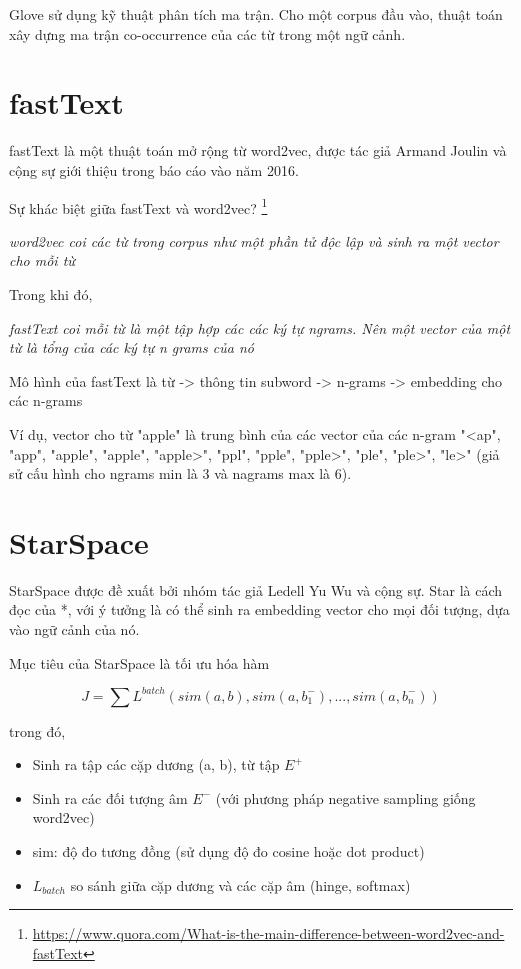 Glove \cite{DBLP:conf/emnlp/PenningtonSM14} sử dụng kỹ thuật phân tích ma trận. Cho một corpus đầu vào, thuật toán xây dựng ma trận co-occurrence của các từ trong một ngữ cảnh.

\section{fastText}

fastText \cite{DBLP:conf/eacl/GraveMJB17} là một thuật toán mở rộng từ word2vec, được tác giả Armand Joulin  và cộng sự giới thiệu trong báo cáo vào năm 2016.

\noindent Sự khác biệt giữa fastText và word2vec? \footnote{\href{https://www.quora.com/What-is-the-main-difference-between-word2vec-and-fastText}{https://www.quora.com/What-is-the-main-difference-between-word2vec-and-fastText}}

\textit{word2vec coi các từ trong corpus như một phần tử độc lập và sinh ra một vector cho mỗi từ}

\noindent Trong khi đó,

\textit{fastText coi mỗi từ là một tập hợp các các ký tự ngrams. Nên một vector của một từ là tổng của các ký tự n grams của nó}

Mô hình của fastText là từ -> thông tin subword -> n-grams -> embedding cho các n-grams

Ví dụ, vector cho từ "apple" là trung bình của các vector của các n-gram "<ap", "app", "apple", "apple", "apple>", "ppl", "pple", "pple>", "ple", "ple>", "le>" (giả sử cấu hình cho ngrams min là 3 và nagrams max là 6).

\section{StarSpace}

StarSpace được đề xuất bởi nhóm tác giả Ledell Yu Wu và cộng sự. Star là cách đọc của *, với ý tưởng là có thể sinh ra embedding vector cho mọi đối tượng, dựa vào ngữ cảnh của nó.

Mục tiêu của StarSpace là tối ưu hóa hàm

$$J = \sum L^{batch} \left( sim(a, b), sim(a, b_1^{-}),..., sim(a, b_n^{-}) \right)$$

trong đó,

\begin{itemize}
  \item Sinh ra tập các cặp dương (a, b), từ tập $E^{+}$
  \item Sinh ra các đối tượng âm $E^{-}$ (với phương pháp negative sampling giống word2vec)
  \item sim: độ đo tương đồng (sử dụng độ đo cosine hoặc dot product)
  \item $L_{batch}$ so sánh giữa cặp dương và các cặp âm (hinge, softmax)
\end{itemize}

